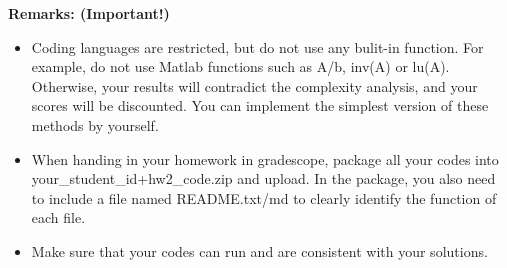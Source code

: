 \documentclass[english,onecolumn]{IEEEtran}
\begin{document}
\begin{enumerate}
\noindent\textbf{Remarks: (Important!)} 
\begin{itemize}
    \item Coding languages are restricted, but do not use any bulit-in function. For example, do not use {\sf Matlab} functions such as {\sf A/b}, {\sf inv(A)} or {\sf lu(A)}. Otherwise, your results will contradict the complexity analysis, and your scores will be discounted. You can implement the simplest version of these methods by yourself.
    \item When handing in your homework in gradescope, package all your codes into {\sf your\_student\_id+hw2\_code.zip} and upload. In the package, you also need to include a file named {\sf README.txt/md} to clearly identify the function of each file.
     \item Make sure that your codes can run and are consistent with your solutions.
\end{itemize}
\end{enumerate} 
\end{document}
